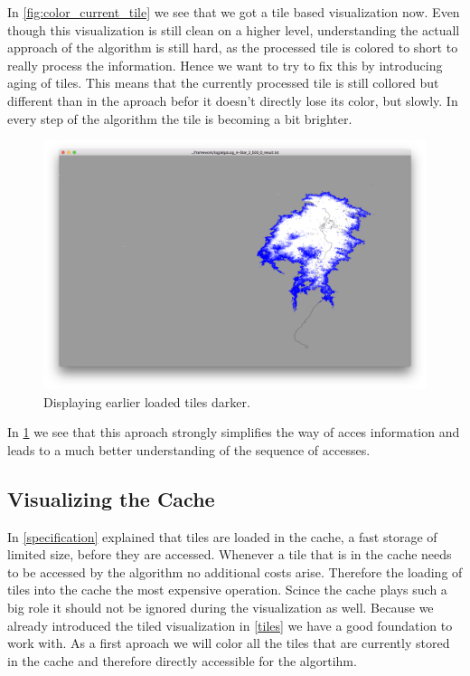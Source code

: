 \documentclass
[
	paper = a4,
    pagesize,
	12 pt,
	oneside,                       %
    open = right,
	DIV = calc,
	BCOR = 0 mm,                   %
	bibtotoc
]
{scrbook}
\begin{document}
In \cref{fig:color_current_tile} we see that we got a tile based visualization now.
Even though this visualization is still clean on a higher level, understanding the actuall approach of the algorithm is still hard, as the processed tile is colored to short to really process the information.
Hence we want to try to fix this by introducing aging of tiles.
This means that the currently processed tile is still collored but different than in the aproach befor it doesn't directly lose its color, but slowly.
In every step of the algorithm the tile is becoming a bit brighter.

\begin{figure}[H]
	\includegraphics[width=\textwidth]{Images/vis-aged-coloring.png}
\caption[]{Displaying earlier loaded tiles darker.}
\label{fig:color_aged_tile}
\end{figure}


In \cref{fig:color_aged_tile} we see that this aproach strongly simplifies the way of acces information and leads to a much better understanding of the sequence of accesses.


\subsection{Visualizing the Cache}

In \cref{specification} explained that tiles are loaded in the cache, a fast storage
of limited size, before they are accessed.
Whenever a tile that is in the cache needs to be accessed by the algorithm no additional costs arise.
Therefore the loading of tiles into the cache the most expensive operation.
Scince the cache plays such a big role it should not be ignored during the visualization as well.
Because we already introduced the tiled visualization in \cref{tiles} we have a good foundation to work with.
As a first aproach we will color all the tiles that are currently stored in the cache and therefore directly accessible for the algortihm.
\end{document}
